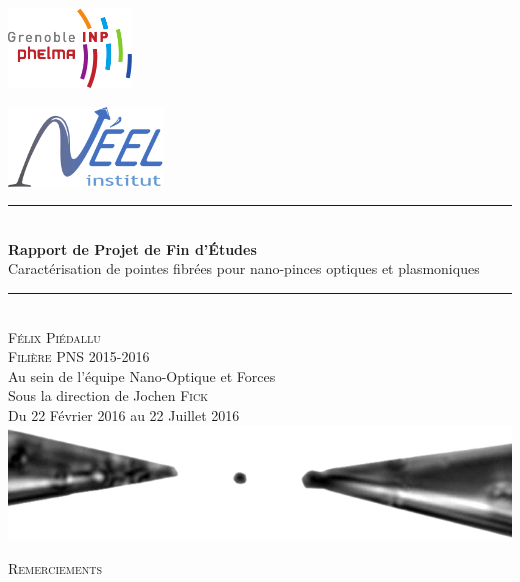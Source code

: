 \begin{titlepage}
    \vspace*{-10px}
    \includegraphics[height=80px]{Images/logo_phelma.pdf}
    \vspace*{-80px}
\begin{flushright}
    \vspace*{-10px}
    \includegraphics[height=80px]{Images/Logo_Neel.pdf}
\end{flushright}

\vspace*{1.5cm}
\begin{center}
\rule{\linewidth}{0.5mm}\\[0.4cm]
{\huge{\bfseries Rapport de Projet de Fin d'Études}\\[0.4cm]
Caractérisation de pointes fibrées pour nano-pinces optiques et plasmoniques\\[0.4cm]}
\rule{\linewidth}{0.5mm}\\[0.5cm]

\LARGE{\textsc{Félix Piédallu}}\\[0.7cm]
\large{\textsc{Filière PNS 2015-2016}}\\[2cm]

\Large{Au sein de l'équipe Nano-Optique et Forces}\\[1cm]

\Large{Sous la direction de Jochen \textsc{Fick}}\\[1cm]

\large{Du 22 Février 2016 au 22 Juillet 2016}\\[2cm]

\includegraphics[width=\textwidth]{Images/Illustration.png}\\[1cm]


\end{center}
\end{titlepage}
\newpage\null\thispagestyle{empty}\newpage
\begin{center}
\textsc{\Large Remerciements}
\end{center}

